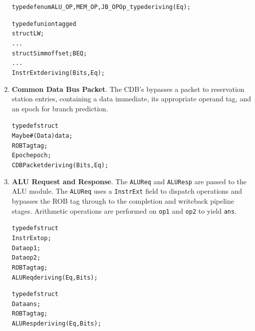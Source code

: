 \documentclass[12pt]{article}
\begin{document}
\begin{enumerate}
\begin{alltt}
        typedef enum {ALU_OP, MEM_OP, JB_OP} Op_type deriving(Eq);    
        
        typedef union tagged {
            struct {} LW;
            ...
            struct { Simm offset;  } BEQ;
            ...
        } InstrExt deriving (Bits, Eq);
    \end{alltt}
    \item \textbf{Common Data Bus Packet}. The CDB's bypasses a packet to reservation station entries, containing
    a data immediate, its appropriate operand tag, and an epoch for branch prediction.
    \begin{alltt}
        typedef struct {
            Maybe#(Data) data;
            ROBTag tag;
            Epoch epoch;
        } CDBPacket deriving (Bits, Eq);
    \end{alltt}
    \item \textbf{ALU Request and Response}. The \verb=ALUReq= and \verb=ALUResp= are passed to the ALU module.
    The \verb=ALUReq= uses a \verb=InstrExt= field to dispatch operations and bypasses the ROB tag through
    to the completion and writeback pipeline stages. Arithmetic operations are performed on \verb=op1= and 
    \verb=op2= to yield \verb=ans=. 
    \begin{alltt}
        typedef struct {
            InstrExt  op;
            Data      op1;
            Data      op2;
            ROBTag    tag;
        } ALUReq deriving (Eq, Bits);

        typedef struct {
            Data   ans;
            ROBTag tag;
        } ALUResp deriving (Eq, Bits);
    \end{alltt}
\end{enumerate}
\end{document}
